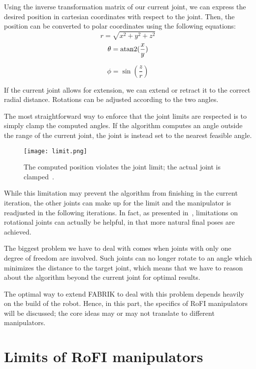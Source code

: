 Using the inverse transformation matrix of our current joint, we can express the desired position in cartesian coordinates with respect to the joint. Then, the position can be converted to polar coordinates using the following equations:
\begin{equation}
  r = \sqrt{x^2 + y^2 + z^2}
\end{equation}
\begin{equation}
  \theta = \operatorname{atan2}(\frac{x}{y})
\end{equation}

\begin{equation}
  \phi = \sin(\frac{z}{r})
\end{equation}

If the current joint allows for extension, we can extend or retract it to the correct radial distance. Rotations can be adjusted according to the two angles.

The most straightforward way to enforce that the joint limits are respected is to simply clamp the computed angles. If the algorithm computes an angle outside the range of the current joint,
the joint is instead set to the nearest feasible angle.

\begin{figure}[h]
    \centering
    \texttt{[image: limit.png]}
    \caption{The computed position violates the joint limit; the actual joint is clamped~\cite{Ondika2021thesis}.}\label{fig:break}
\end{figure}

While this limitation may prevent the algorithm from finishing in the current iteration, the other joints can make up for the limit and the manipulator is readjusted in the following iterations. In fact, as presented in~\cite{fabrik}, limitations on rotational joints can actually be helpful, in that more natural final poses are achieved.

The biggest problem we have to deal with comes when joints with only one degree of freedom are involved. Such joints can no longer rotate to an angle which minimizes the distance to the target joint, which means that we have to reason about the algorithm beyond the current joint for optimal results.

The optimal way to extend FABRIK to deal with this problem depends heavily on the build of the robot. Hence, in this part, the specifics of RoFI manipulators will be discussed; the core ideas may or may not translate to different manipulators.

\section{Limits of RoFI manipulators}

